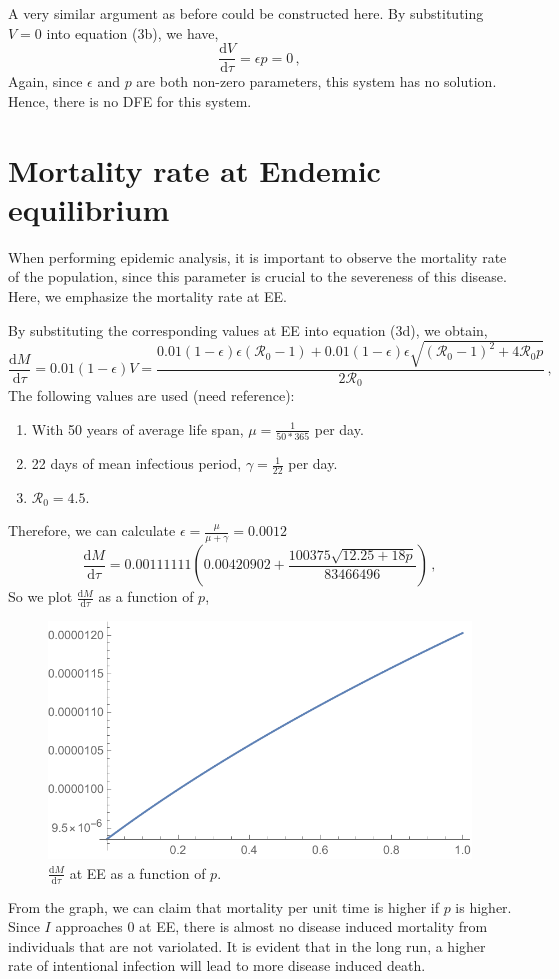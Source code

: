 \documentclass[12pt]{article}
\newcommand\dbyd[2]{\frac{\mathrm d{#1}}{\mathrm d{#2}}}
\newcommand{\R}{\mathcal{R}}
\begin{document}
A very similar argument as before could be constructed here.
By substituting $V=0$ into equation (3b), we have,
\begin{equation}
\dbyd{V}{\tau}=\epsilon p = 0\,,
\end{equation}
Again, since $\epsilon$ and $p$ are both non-zero parameters, this system has no solution. Hence, there is no DFE for this system.
\section{Mortality rate at Endemic equilibrium}
When performing epidemic analysis, it is important to observe the mortality rate of the population, since this parameter is crucial to the severeness of this disease. Here, we emphasize the mortality rate at EE.

By substituting the corresponding values at EE into equation (3d), we obtain,
\begin{equation}
\dbyd{M}{\tau}=0.01(1-\epsilon)V=\frac{0.01(1-\epsilon)\epsilon(\R_0 -1)+ 0.01(1-\epsilon)\epsilon \sqrt{(\R_0-1)^2+4\R_0 p}}{2\R_0}\,,
\end{equation}
The following values are used (need reference): 
\begin{enumerate}
\item With 50 years of average life span, $\mu=\frac{1}{50*365}$ per day.
\item 22 days of mean infectious period, $\gamma=\frac{1}{22}$ per day.
\item $\R_0=4.5$.
\end{enumerate}
Therefore, we can calculate $\epsilon=\frac{\mu}{\mu+\gamma}=0.0012$
\begin{equation}
\dbyd{M}{\tau}=0.00111111(0.00420902+\frac{100375\sqrt{12.25+18p}}{83466496})\,,
\end{equation}
So we plot $\dbyd{M}{\tau}$ as a function of $p$,
\begin{figure}[H]
  \centering
  \includegraphics[width=1\textwidth]{Figures/Plot_dmdt_as_f_of_p.pdf}
  \caption{$\dbyd{M}{\tau}$ at EE as a function of $p$.}
\end{figure}
From the graph, we can claim that mortality per unit time is higher if $p$ is higher. Since $I$ approaches 0 at EE, there is almost no disease induced mortality from individuals that are not variolated. It is evident that in the long run, a higher rate of intentional infection will lead to more disease induced death.
\end{document}

